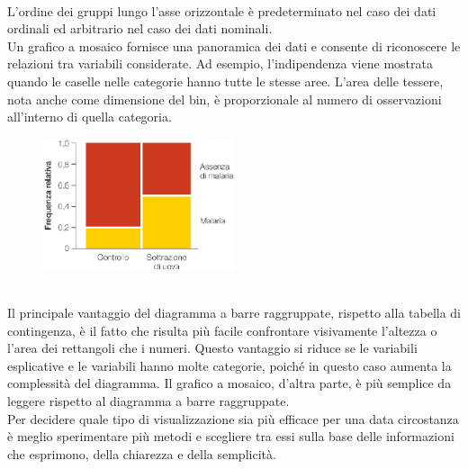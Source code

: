 \documentclass[10pt, draft]{book}
\begin{document}
\\
L'ordine dei gruppi lungo l'asse orizzontale è predeterminato nel caso dei dati ordinali ed arbitrario nel caso dei dati nominali.
\\
Un grafico a mosaico fornisce una panoramica dei dati e consente di riconoscere le relazioni tra variabili considerate. Ad esempio, l'indipendenza viene mostrata quando le caselle nelle categorie hanno tutte le stesse aree. L'area delle tessere, nota anche come dimensione del bin, è proporzionale al numero di osservazioni all'interno di quella categoria.
\\
\begin{figure}[h]\label{fig2.3-2}
    \centering
    \includegraphics[width=0.5\textwidth]{fig2.3-2}
    \caption{\small{}}
    \end{figure}
\\
Il principale vantaggio del diagramma a barre raggruppate, rispetto alla tabella di contingenza, è il fatto che risulta più facile confrontare visivamente l'altezza o l'area dei rettangoli che i numeri.  Questo vantaggio si riduce se le variabili esplicative e le variabili hanno molte categorie, poiché in questo caso aumenta la complessità del diagramma. Il grafico a mosaico, d'altra parte, è più semplice da leggere rispetto al diagramma a barre raggruppate.
\\
Per decidere quale tipo di visualizzazione sia più efficace per una data circostanza è meglio sperimentare più metodi e scegliere tra essi sulla base delle informazioni che esprimono, della chiarezza e della semplicità.
\end{document}
